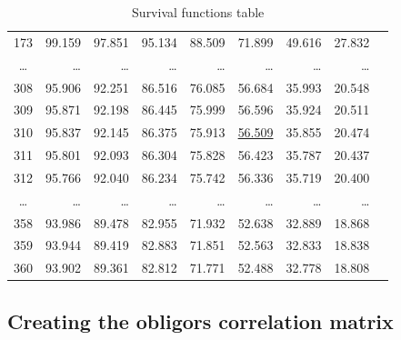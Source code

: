\documentclass[a4paper,12pt,final]{article}
\begin{document}
\begin{table}[!hb]
\begin{center}
{\begin{tabular}[]{c|rrrrrrrr}
173 &  99.159 &  97.851 &  95.134 &  88.509 &  71.899 &  49.616 &  27.832 \\
\ldots & \ldots & \ldots & \ldots & \ldots & \ldots & \ldots & \ldots \\
308 &  95.906 &  92.251 &  86.516 &  76.085 &  56.684 &  35.993 &  20.548 \\
309 &  95.871 &  92.198 &  86.445 &  75.999 &  56.596 &  35.924 &  20.511 \\
310 &  95.837 &  92.145 &  86.375 &  75.913 &  \underline{56.509} &  35.855 &  20.474 \\
311 &  95.801 &  92.093 &  86.304 &  75.828 &  56.423 &  35.787 &  20.437 \\
312 &  95.766 &  92.040 &  86.234 &  75.742 &  56.336 &  35.719 &  20.400 \\
\ldots & \ldots & \ldots & \ldots & \ldots & \ldots & \ldots & \ldots \\
358 &  93.986 &  89.478 &  82.955 &  71.932 &  52.638 &  32.889 &  18.868 \\
359 &  93.944 &  89.419 &  82.883 &  71.851 &  52.563 &  32.833 &  18.838 \\
360 &  93.902 &  89.361 &  82.812 &  71.771 &  52.488 &  32.778 &  18.808 \\
\end{tabular}
}
\caption{Survival functions table}
\label{example.survivals}
\end{center}
\end{table}

\clearpage 

\subsection{Creating the obligors correlation matrix}
\end{document}
